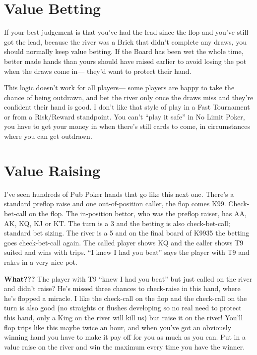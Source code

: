 \section{Value Betting}

If your best judgement is that you've had the lead since the flop
and you've still got the lead, because the river was a Brick
that didn't complete any draws, you should normally keep value betting.
If the Board has been wet the whole time, better made hands than
yours should have raised earlier to avoid losing the pot when the
draws come in--- they'd want to protect their hand.

This logic doesn't work for all players--- some players are happy
to take the chance of being outdrawn, and bet the river only once
the draws miss and they're confident their hand is good. I don't
like that style of play in a Fast Tournament or from a
Risk/Reward standpoint. You can't ``play it safe'' in No Limit Poker,
you have to get your money in when there's still cards to come, in
circumstances where you can get outdrawn.

\section{Value Raising}

I've seen hundreds of Pub Poker hands that go like this next
one. There's a standard preflop raise and one out-of-position caller,
the flop comes K99. Check-bet-call on the flop. The in-position
bettor, who was the preflop raiser, has AA, AK, KQ, KJ or KT. The turn
is a 3 and the betting is also check-bet-call; standard bet
sizing. The river is a 5 and on the final board of K9935 the betting
goes check-bet-call again. The called player shows KQ and the caller
shows T9 suited and wins with trips. ``I knew I had you beat'' says the
player with T9 and rakes in a very nice pot.

\textbf{What???} The player with T9 ``knew I had you beat'' but just
called on the river and didn't raise? He's missed three chances to
check-raise in this hand, where he's flopped a miracle. I like the
check-call on the flop and the check-call on the turn is also good (no
straights or flushes developing so no real need to protect this hand,
only a King on the river will kill us) but raise it on the river!
You'll flop trips like this maybe twice an hour, and when you've
got an obviously winning hand you have to make it pay off for you as
much as you can. Put in a value raise on the river and win the maximum
every time you have the winner.

